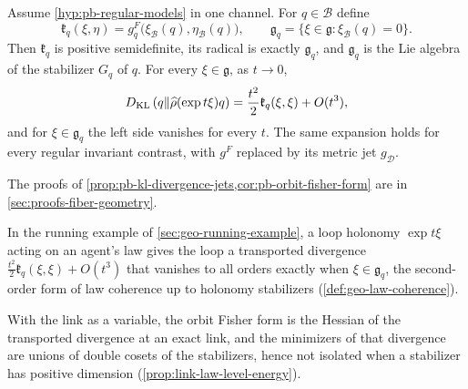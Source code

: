 Assume \cref{hyp:pb-regular-models} in one channel.  For $q\in\mathcal B$ define
\begin{equation}
\mathfrak k_q(\xi,\eta)=g^F_q\bigl(\xi_{\mathcal B}(q),\eta_{\mathcal B}(q)\bigr),
\qquad
\mathfrak g_q=\{\xi\in\mathfrak g:\xi_{\mathcal B}(q)=0\}.
\label{eq:pb-orbit-fisher-form}
\end{equation}
Then $\mathfrak k_q$ is positive semidefinite, its radical is exactly $\mathfrak g_q$,
and $\mathfrak g_q$ is the Lie algebra of the stabilizer $G_q$ of $q$.  For every
$\xi\in\mathfrak g$, as $t\to0$,
\begin{equation}
D_{\mathrm{KL}}\left(q\Vert\widehat\rho(\exp t\xi)q\right)
=\frac{t^2}{2}\mathfrak k_q(\xi,\xi)+O(t^3),
\label{eq:pb-orbit-kl-expansion}
\end{equation}
and for $\xi\in\mathfrak g_q$ the left side vanishes for every $t$.  The same expansion
holds for every regular invariant contrast, with $g^F$ replaced by its metric jet
$g_{\mathscr D}$.  

The proofs of \cref{prop:pb-kl-divergence-jets,cor:pb-orbit-fisher-form} are in
\cref{sec:proofs-fiber-geometry}.

In the running example of \cref{sec:geo-running-example}, a loop holonomy $\exp t\xi$
acting on an agent's law gives the loop a transported divergence
$\tfrac{t^2}{2}\mathfrak k_q(\xi,\xi)+O(t^3)$ that vanishes to all orders exactly when
$\xi\in\mathfrak g_q$, the second-order form of law coherence up to holonomy stabilizers
(\cref{def:geo-law-coherence}).

With the link as a variable, the orbit Fisher form is the Hessian of the transported divergence at an
exact link, and the minimizers of that divergence are unions of double cosets of the stabilizers, hence
not isolated when a stabilizer has positive dimension (\cref{prop:link-law-level-energy}).

